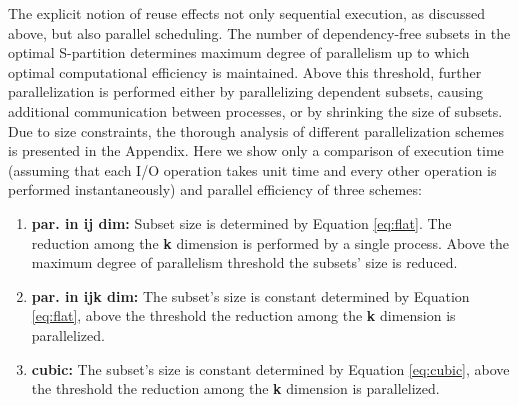 \documentclass[sigconf]{acmart}
\begin{document}
The explicit notion of reuse effects not only sequential execution, as 
discussed above, but also parallel scheduling. The number of dependency-free 
subsets in the optimal S-partition determines maximum degree of parallelism up 
to which optimal computational efficiency is maintained. Above this threshold, 
further parallelization is performed either by parallelizing dependent subsets, 
causing additional communication between processes, or by shrinking the size of 
subsets.
 Due to size constraints, the thorough analysis of different parallelization 
 schemes is presented in the Appendix.  Here we show only a comparison of 
 execution time (assuming that each I/O operation takes unit time and every 
 other operation is performed instantaneously) and parallel efficiency of three 
 schemes: 
\begin{enumerate}
	\item \textbf{par. in ij dim:} Subset size is determined by Equation 
	\ref{eq:flat}. 
	The reduction among the \textbf{k} 
	dimension is performed by a single process. Above the maximum degree of 
	parallelism threshold the 
	subsets' size is reduced.
	\item \textbf{par. in ijk dim:} The subset's size is constant determined by 
	Equation \ref{eq:flat}, above the 
	threshold the reduction among the \textbf{k} dimension is parallelized.
	\item \textbf{cubic:} The subset's size is constant determined by Equation 
	\ref{eq:cubic}, above the threshold 
	the reduction among the \textbf{k} dimension is parallelized.
\end{enumerate}
\end{document}
